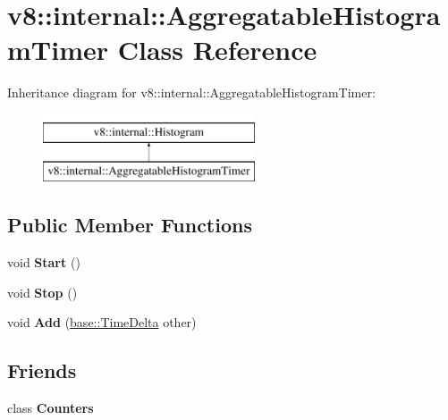 \hypertarget{classv8_1_1internal_1_1AggregatableHistogramTimer}{}\section{v8\+:\+:internal\+:\+:Aggregatable\+Histogram\+Timer Class Reference}
\label{classv8_1_1internal_1_1AggregatableHistogramTimer}
Inheritance diagram for v8\+:\+:internal\+:\+:Aggregatable\+Histogram\+Timer\+:\begin{figure}[H]
\begin{center}
\leavevmode
\includegraphics[height=2.000000cm]{classv8_1_1internal_1_1AggregatableHistogramTimer}
\end{center}
\end{figure}
\subsection*{Public Member Functions}
\begin{DoxyCompactItemize}
\item 
\mbox{\label{classv8_1_1internal_1_1AggregatableHistogramTimer_a90f85567bb20dba01c8d4e69578db899}} 
void {\bfseries Start} ()
\item 
\mbox{\label{classv8_1_1internal_1_1AggregatableHistogramTimer_ada969f70c76ed1eace83ea0491d7af5e}} 
void {\bfseries Stop} ()
\item 
\mbox{\label{classv8_1_1internal_1_1AggregatableHistogramTimer_ad56ff543a2b2816fe290fdc2d259c844}} 
void {\bfseries Add} (\mbox{\hyperlink{classv8_1_1base_1_1TimeDelta}{base\+::\+Time\+Delta}} other)
\end{DoxyCompactItemize}
\subsection*{Friends}
\begin{DoxyCompactItemize}
\item 
\mbox{\label{classv8_1_1internal_1_1AggregatableHistogramTimer_a5545327f141103b96b160ddc48274bc0}} 
class {\bfseries Counters}
\end{DoxyCompactItemize}
